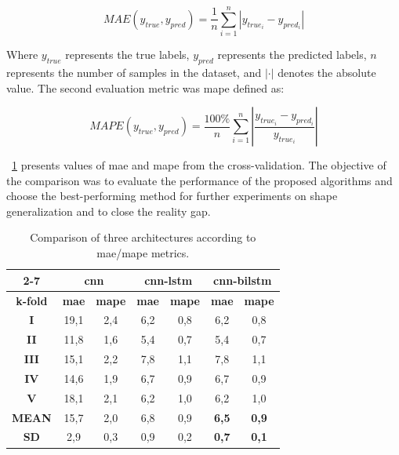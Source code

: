 \documentclass[a4paper, 10pt, twoside]{report}
\begin{document}
\begin{equation}
MAE(y_{true}, y_{pred}) = \frac{1}{n}\sum_{i=1}^{n}\left| y_{true_i} - y_{pred_i} \right|
\end{equation}

Where $y_{true}$ represents the true labels, $y_{pred}$ represents the predicted labels, $n$ represents the number of samples in the dataset, and $\left| \cdot \right|$ denotes the absolute value. The second evaluation metric was \acrfull{mape} defined as:

\begin{equation}
MAPE(y_{true}, y_{pred}) = \frac{100\%}{n}\sum_{i=1}^{n}\left|\frac{y_{true_i} - y_{pred_i}}{y_{true_i}}\right|
\end{equation}

\Table~\ref{tab:1st} presents values of \acrshort{mae} and \acrshort{mape} from the cross-validation. The objective of the comparison was to evaluate the performance of the proposed algorithms and choose the best-performing method for further experiments on shape generalization and to close the reality gap.

\begin{table}[hbt]
\centering
\caption{Comparison of three architectures according to \acrshort{mae}/\acrshort{mape} metrics. }
\begin{tabular}{c|c|c|c|c|c|c|}
\cline{2-7}
 & \multicolumn{2}{c|}{\textbf{\acrshort{cnn}}} & \multicolumn{2}{c|}{\textbf{ \acrshort{cnn}-\acrshort{lstm}}} & \multicolumn{2}{c|}{\textbf{\acrshort{cnn}-\acrshort{bilstm}}} \\ \hline
\multicolumn{1}{|c|}{\textbf{k-fold}} & \textbf{\acrshort{mae}} & \textbf{\acrshort{mape}} & \textbf{\acrshort{mae}} & \textbf{\acrshort{mape}} & \textbf{\acrshort{mae}} & \textbf{\acrshort{mape}} \\ \hline
\multicolumn{1}{|c|}{\textbf{I}} & 19,1 & 2,4 & 6,2 & 0,8 & 6,2 & 0,8 \\ \hline
\multicolumn{1}{|c|}{\textbf{II}} & 11,8 & 1,6 & 5,4 & 0,7 & 5,4 & 0,7 \\ \hline
\multicolumn{1}{|c|}{\textbf{III}} & 15,1 & 2,2 & 7,8 & 1,1 & 7,8 & 1,1 \\ \hline
\multicolumn{1}{|c|}{\textbf{IV}} & 14,6 & 1,9 & 6,7 & 0,9 & 6,7 & 0,9 \\ \hline
\multicolumn{1}{|c|}{\textbf{V}} & 18,1 & 2,1 & 6,2 & 1,0 & 6,2 & 1,0 \\ \hline
\multicolumn{1}{|c|}{\textbf{MEAN}} & 15,7 & 2,0 & 6,8 & 0,9 & \textbf{6,5} & \textbf{0,9} \\ \hline
\multicolumn{1}{|c|}{\textbf{SD}} & 2,9 & 0,3 & 0,9 & 0,2 & \textbf{0,7} & \textbf{0,1} \\ \hline
\end{tabular}
\label{tab:1st}
\end{table}
\end{document}
